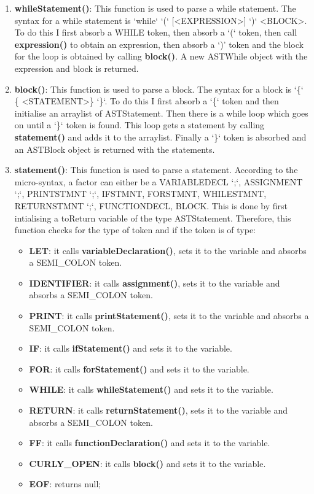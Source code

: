 \documentclass{article}
\begin{document}
\begin{enumerate}
			
								\item \textbf{whileStatement()}: This function is used to parse a while statement. The syntax for a while statement is `while` `(` [\textless EXPRESSION\textgreater] `)` \textless BLOCK\textgreater. To do this I first absorb a WHILE token, then absorb a `(` token, then call \textbf{expression()} to obtain an expression, then absorb a `)' token and the block for the loop is obtained by calling \textbf{block()}. A new ASTWhile object with the expression and block is returned.
								
							\item \textbf{block()}: This function is used to parse a block. The syntax for a block is `\{` \{ \textless STATEMENT\textgreater \} `\}`. To do this I first absorb a `\{` token and then initialise an arraylist of ASTStatement. Then there is a while loop which goes on until a `\}` token is found. This loop gets a statement by calling \textbf{statement()} and adds it to the arraylist. Finally a `\}` token is absorbed and an ASTBlock object is returned with the statements.
				
					\item \textbf{statement()}: This function is used to parse a statement. According to the micro-syntax, a factor can either be a VARIABLEDECL `;`, ASSIGNMENT `;`,  PRINTSTMNT `;`, IFSTMNT, FORSTMNT,  WHILESTMNT, RETURNSTMNT `;`, FUNCTIONDECL, BLOCK.
					This is done by first intialising a toReturn variable of the type ASTStatement. Therefore, this function checks for the type of token and if the token is of type:
				
				\begin{itemize}
				\item \textbf{LET}: it calls \textbf{variableDeclaration()}, sets it to the variable and absorbs a SEMI\_COLON token.
				\item \textbf{IDENTIFIER}: it calls \textbf{assignment()}, sets it to the variable and absorbs a SEMI\_COLON token.
				\item \textbf{PRINT}: it calls \textbf{printStatement()}, sets it to the variable and absorbs a SEMI\_COLON token.
				\item \textbf{IF}: it calls \textbf{ifStatement()} and sets it to the variable.	
				\item \textbf{FOR}: it calls \textbf{forStatement()} and sets it to the variable.	
				\item \textbf{WHILE}: it calls \textbf{whileStatement()} and sets it to the variable.	
				\item \textbf{RETURN}: it calls \textbf{returnStatement()}, sets it to the variable and absorbs a SEMI\_COLON token.
				\item \textbf{FF}: it calls \textbf{functionDeclaration()} and sets it to the variable.	
				\item \textbf{CURLY\_OPEN}: it calls \textbf{block()} and sets it to the variable.	
				\item \textbf{EOF}: returns null;	
					\end{itemize}
					

\end{enumerate}
\end{document}
